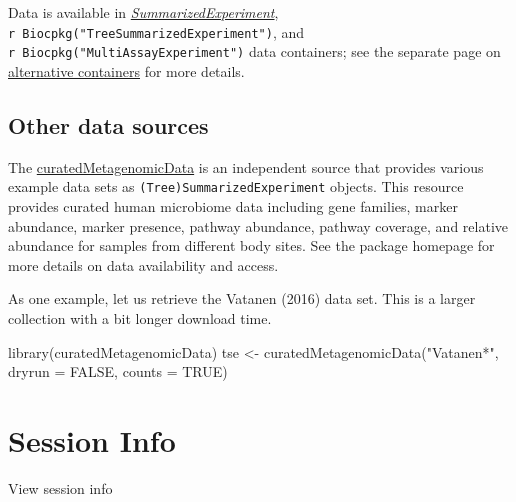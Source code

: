\documentclass[
]{book}
\newenvironment{Shaded}{\begin{snugshade}}{\end{snugshade}}
\newcommand{\AttributeTok}[1]{\textcolor[rgb]{0.77,0.63,0.00}{#1}}
\newcommand{\ConstantTok}[1]{\textcolor[rgb]{0.00,0.00,0.00}{#1}}
\newcommand{\FunctionTok}[1]{\textcolor[rgb]{0.00,0.00,0.00}{#1}}
\newcommand{\NormalTok}[1]{#1}
\newcommand{\OtherTok}[1]{\textcolor[rgb]{0.56,0.35,0.01}{#1}}
\newcommand{\StringTok}[1]{\textcolor[rgb]{0.31,0.60,0.02}{#1}}
\begin{document}
Data is available in \emph{\href{https://bioconductor.org/packages/3.14/SummarizedExperiment}{SummarizedExperiment}}, \texttt{r\ Biocpkg("TreeSummarizedExperiment")}, and \texttt{r\ Biocpkg("MultiAssayExperiment")} data containers; see the separate
page on \href{https://microbiome.github.io/OMA/multitable.html}{alternative
containers} for more
details.

\hypertarget{other-data-sources}{%
\subsection{Other data sources}\label{other-data-sources}}

The
\href{https://waldronlab.io/curatedMetagenomicData}{curatedMetagenomicData}
is an independent source that provides various example data sets as
\texttt{(Tree)SummarizedExperiment} objects. This resource provides curated
human microbiome data including gene families, marker abundance,
marker presence, pathway abundance, pathway coverage, and relative
abundance for samples from different body sites. See the package
homepage for more details on data availability and access.

As one example, let us retrieve the Vatanen (2016) \citep{Vatanen2016} data
set. This is a larger collection with a bit longer download time.

\begin{Shaded}
\begin{Highlighting}[]
\FunctionTok{library}\NormalTok{(curatedMetagenomicData)}
\NormalTok{tse }\OtherTok{\textless{}{-}} \FunctionTok{curatedMetagenomicData}\NormalTok{(}\StringTok{"Vatanen*"}\NormalTok{, }\AttributeTok{dryrun =} \ConstantTok{FALSE}\NormalTok{, }\AttributeTok{counts =} \ConstantTok{TRUE}\NormalTok{)}
\end{Highlighting}
\end{Shaded}

\hypertarget{session-info}{%
\section*{Session Info}\label{session-info}}

View session info
\end{document}
